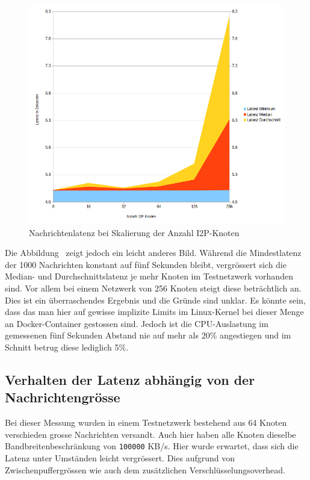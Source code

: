 \begin{figure}[htp]
  \includegraphics[width=1.1\textwidth]{img/auswertung-latenz.png}
  \caption{Nachrichtenlatenz bei Skalierung der Anzahl I2P-Knoten}\label{fig:auswertung-latenz}
\end{figure}


Die Abbildung~ zeigt jedoch ein leicht anderes Bild.
Während die Mindestlatenz der 1000 Nachrichten konstant auf fünf Sekunden bleibt, vergrössert sich die Median- und Durchschnittslatenz je mehr Knoten im Testnetzwerk vorhanden sind.
Vor allem bei einem Netzwerk von 256 Knoten steigt diese beträchtlich an.
Dies ist ein überraschendes Ergebnis und die Gründe sind unklar.
Es könnte sein, dass das man hier auf gewisse implizite Limits im Linux-Kernel bei dieser Menge an Docker-Container gestossen sind.
Jedoch ist die CPU-Auslastung im gemessenen fünf Sekunden Abstand nie auf mehr als 20\% angestiegen und im Schnitt betrug diese lediglich 5\%.


\subsection{Verhalten der Latenz abhängig von der Nachrichtengrösse}\label{sec:messung_nachrichtengroesse}

Bei dieser Messung wurden in einem Testnetzwerk bestehend aus 64 Knoten verschieden grosse Nachrichten versandt.
Auch hier haben alle Knoten dieselbe Bandbreitenbeschränkung von \lstinline|100000| KB/s.
Hier wurde erwartet, dass sich die Latenz unter Umständen leicht vergrössert. Dies aufgrund von Zwischenpuffergrössen wie auch dem zusätzlichen Verschlüsselungsoverhead.

